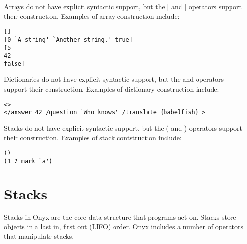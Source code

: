 Arrays do not have explicit syntactic support, but the [ and ] operators support
their construction.  Examples of array construction include:
\begin{verbatim}
[]
[0 `A string' `Another string.' true]
[5
42
false]
\end{verbatim}

Dictionaries do not have explicit syntactic support, but the {\lt} and
{\gt} operators support their construction.  Examples of dictionary
construction include:
\begin{verbatim}
<>
</answer 42 /question `Who knows' /translate {babelfish} >
\end{verbatim}

Stacks do not have explicit syntactic support, but the ( and ) operators support
their construction.  Examples of stack contstruction include:
\begin{verbatim}
()
(1 2 mark `a')
\end{verbatim}

\section{Stacks}

Stacks in Onyx are the core data structure that programs act on.  Stacks store
objects in a last in, first out (LIFO) order.  Onyx includes a number of
operators that manipulate stacks.

